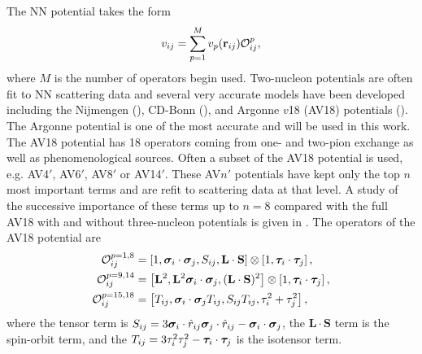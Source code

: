 The NN potential takes the form
\begin{equation}
   v_{ij} = \sum\limits_{p=1}^M v_p(\mathbf{r}_{ij})\mathcal{O}^p_{ij},
\end{equation}
where $M$ is the number of operators begin used.
Two-nucleon potentials are often fit to NN scattering data and several very accurate models have been developed including the Nijmengen (\cite{nagels1975,stoks1994}), CD-Bonn (\cite{machleidt1996,machleidt2001}), and Argonne $v$18 (AV18) potentials (\cite{wiringa1984,wiringa1995}). The Argonne potential is one of the most accurate and will be used in this work. The AV18 potential has 18 operators coming from one- and two-pion exchange as well as phenomenological sources. Often a subset of the AV18 potential is used, e.g. AV4$'$, AV6$'$, AV8$'$ or AV14$'$. These AV$n'$ potentials have kept only the top $n$ most important terms and are refit to scattering data at that level. A study of the successive importance of these terms up to $n=8$ compared with the full AV18 with and without three-nucleon potentials is given in \cite{wiringa2002}. The operators of the AV18 potential are
\begin{align}
   \mathcal{O}_{ij}^{p=1,8} &= \left[1,\bm{\sigma}_i\cdot\bm{\sigma}_j,S_{ij},\mathbf{L}\cdot\mathbf{S}\right]\otimes\left[1,\bm{\tau}_i\cdot\bm{\tau}_j\right], \\
   \mathcal{O}_{ij}^{p=9,14} &= \left[\mathbf{L}^2,\mathbf{L}^2\bm{\sigma}_i\cdot\bm{\sigma}_j,(\mathbf{L}\cdot\mathbf{S})^2\right]\otimes\left[1,\bm{\tau}_i\cdot\bm{\tau}_j\right], \\
   \mathcal{O}_{ij}^{p=15,18} &= \left[T_{ij},\bm{\sigma}_i\cdot\bm{\sigma}_j T_{ij},S_{ij}T_{ij},\tau_i^2+\tau_j^2\right],
\end{align}
where the tensor term is $S_{ij} = 3\bm{\sigma}_i\cdot\hat{r}_{ij}\bm{\sigma}_j\cdot\hat{r}_{ij}-\bm{\sigma}_i\cdot\bm{\sigma}_j$, the $\mathbf{L}\cdot\mathbf{S}$ term is the spin-orbit term, and the $T_{ij} = 3\tau_i^2\tau_j^2-\bm{\tau}_i\cdot\bm{\tau}_j$ is the isotensor term.


